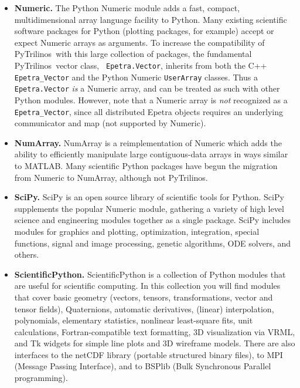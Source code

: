 \documentclass[acmtocl]{acmtrans2m}
\newcommand{\PyTrilinos}{{PyTrilinos}}
\begin{document}
\begin{itemize}

\item {\bf Numeric.} The Python Numeric module adds a fast, compact,
  multidimensional array language facility to Python.  Many existing
  scientific software packages for Python (plotting packages, for
  example) accept or expect Numeric arrays as arguments.  To increase
  the compatibility of \PyTrilinos\ with this large collection of
  packages, the fundamental \PyTrilinos\ vector class, {\tt
    Epetra.Vector}, inherits from both the C++ {\tt Epetra\_Vector}
  and the Python Numeric {\tt UserArray} classes.  Thus a {\tt
    Epetra.Vector} {\sl is} a Numeric array, and can be treated as
  such with other Python modules.  However, note that a Numeric array
  is {\sl not} recognized as a {\tt Epetra\_Vector}, since all
  distributed Epetra objects requires an underlying communicator and
  map (not supported by Numeric).

\item {\bf NumArray.}  NumArray is a reimplementation of Numeric which
  adds the ability to efficiently manipulate large contiguous-data
  arrays in ways similar to MATLAB.  Many scientific Python packages
  have begun the migration from Numeric to NumArray, although not
  \PyTrilinos.

\item {\bf SciPy.} SciPy is an open source library of scientific tools
  for Python. SciPy supplements the popular Numeric module, gathering
  a variety of high level science and engineering modules together as
  a single package. SciPy includes modules for graphics and plotting,
  optimization, integration, special functions, signal and image
  processing, genetic algorithms, ODE solvers, and others.

\item {\bf ScientificPython.}  ScientificPython is a collection of
  Python modules that are useful for scientific computing. In this
  collection you will find modules that cover basic geometry (vectors,
  tensors, transformations, vector and tensor fields), Quaternions,
  automatic derivatives, (linear) interpolation, polynomials,
  elementary statistics, nonlinear least-square fits, unit
  calculations, Fortran-compatible text formatting, 3D visualization
  via VRML, and Tk widgets for simple line plots and 3D wireframe
  models. There are also interfaces to the netCDF library (portable
  structured binary files), to MPI (Message Passing Interface), and to
  BSPlib (Bulk Synchronous Parallel programming).


\end{itemize}
\end{document}
